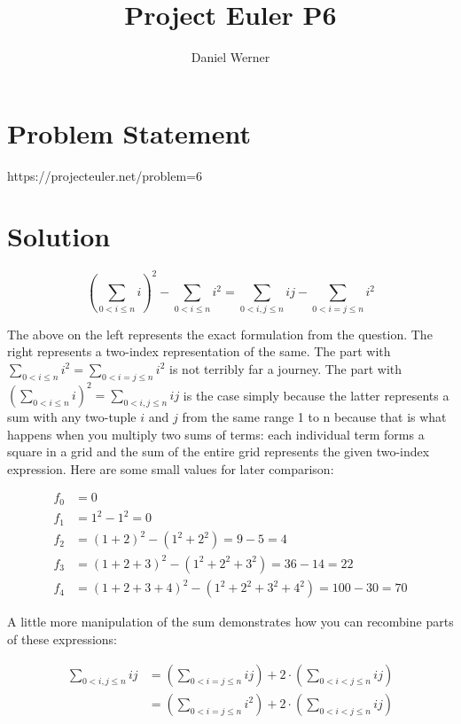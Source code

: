 \documentclass{article}
\title{Project Euler P6}
\author{Daniel Werner}
\begin{document}
\maketitle

\section*{Problem Statement}

https://projecteuler.net/problem=6

\section*{Solution}

\begin{equation*}
    \left( \sum_{0 < i \le n} i \right)^2 
    - \sum_{0 < i \le n} i^2 =
    \sum_{0 < i, j \le n} i j
    - \sum_{0 < i = j \le n} i^2
\end{equation*}

The above on the left represents the exact formulation
from the question.  The right represents a two-index
representation of the same.  The part with
$\sum_{0 < i \le n} i^2 = \sum_{0 < i = j \le n} i^2$
is not terribly far a journey.  The part with 
$\left( \sum_{0 < i \le n} i \right)^2
= \sum_{0 < i, j \le n} i j$ is the case simply because
the latter represents a sum with any two-tuple $i$ and
$j$ from the same range 1 to n because that is what
happens when you multiply two sums of terms: each
individual term forms a square in a grid and the sum of the
entire grid represents the given two-index expression.  Here
are some small values for later comparison:

\begin{align*}
    f_0 &= 0 \\
    f_1 &= 1^2 - 1^2 = 0 \\
    f_2 &= (1 + 2)^2 - (1^2 + 2^2) = 9 - 5 = 4 \\
    f_3 &= (1 + 2 + 3)^2 - (1^2 + 2^2 + 3^2) = 36 - 14 = 22 \\
    f_4 &= (1 + 2 + 3 + 4)^2 - (1^2 + 2^2 + 3^2 + 4^2) = 100 - 30 = 70
\end{align*}

A little more
manipulation of the sum demonstrates how you can recombine
parts of these expressions:

\begin{align*}
    \sum_{0 < i, j \le n} i j
    &=
    \left(\sum_{0 < i=j \le n} i j \right)
    + 2 \cdot \left( \sum_{0 < i < j \le n} i j\right)
    \\
    &=
    \left(\sum_{0 < i = j \le n} i^2\right)
    + 2 \cdot \left(\sum_{0 < i < j \le n} i j\right)
\end{align*}
\end{document}
